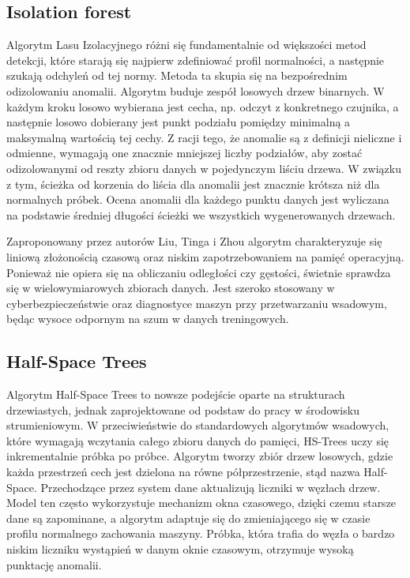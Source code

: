 \documentclass[12pt,twoside]{article}
\begin{document}
\subsection{Isolation forest}
Algorytm Lasu Izolacyjnego różni się fundamentalnie od większości metod detekcji, które starają się najpierw zdefiniować profil normalności, a następnie szukają odchyleń od tej normy. Metoda ta skupia się na bezpośrednim odizolowaniu anomalii. Algorytm buduje zespół losowych drzew binarnych. W każdym kroku losowo wybierana jest cecha, np. odczyt z konkretnego czujnika, a następnie losowo dobierany jest punkt podziału pomiędzy minimalną a maksymalną wartością tej cechy. Z racji tego, że anomalie są z definicji nieliczne i odmienne, wymagają one znacznie mniejszej liczby podziałów, aby zostać odizolowanymi od reszty zbioru danych w pojedynczym liściu drzewa. W związku z tym, ścieżka od korzenia do liścia dla anomalii jest znacznie krótsza niż dla normalnych próbek. Ocena anomalii dla każdego punktu danych jest wyliczana na podstawie średniej długości ścieżki we wszystkich wygenerowanych drzewach.

Zaproponowany przez autorów Liu, Tinga i Zhou \cite{isoforest} algorytm charakteryzuje się liniową złożonością czasową oraz niskim zapotrzebowaniem na pamięć operacyjną. Ponieważ nie opiera się na obliczaniu odległości czy gęstości, świetnie sprawdza się w wielowymiarowych zbiorach danych. Jest szeroko stosowany w cyberbezpieczeństwie oraz diagnostyce maszyn przy przetwarzaniu wsadowym, będąc wysoce odpornym na szum w danych treningowych.

\subsection{Half-Space Trees}
Algorytm Half-Space Trees to nowsze podejście oparte na strukturach drzewiastych, jednak zaprojektowane od podstaw do pracy w środowisku strumieniowym. W przeciwieństwie do standardowych algorytmów wsadowych, które wymagają wczytania całego zbioru danych do pamięci, HS-Trees uczy się inkrementalnie próbka po próbce. Algorytm tworzy zbiór drzew losowych, gdzie każda przestrzeń cech jest dzielona na równe półprzestrzenie, stąd nazwa Half-Space. Przechodzące przez system dane aktualizują liczniki w węzłach drzew. Model ten często wykorzystuje mechanizm okna czasowego, dzięki czemu starsze dane są zapominane, a algorytm adaptuje się do zmieniającego się w czasie profilu normalnego zachowania maszyny. Próbka, która trafia do węzła o bardzo niskim liczniku wystąpień w danym oknie czasowym, otrzymuje wysoką punktację anomalii.
\end{document}
